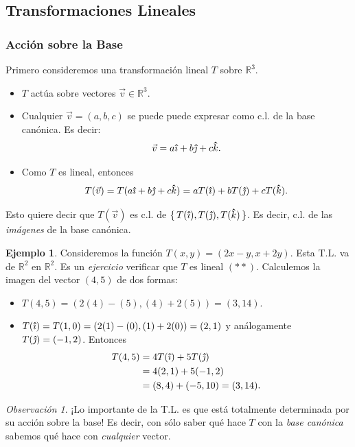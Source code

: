\documentclass[12pt]{article}
\theoremstyle{plain}
\theoremstyle{definition}
\newtheorem{Ex}[Th]{Ejemplo}           %
\theoremstyle{remark}
\newtheorem*{Rmk}{Observación}      %
\newcommand{\thickhat}[1]{\mathbf{\hat{\text{$#1$}}}}
\newcommand{\ii}{\vu{\imath}}
\newcommand{\jj}{\vu{\jmath}}
\newcommand{\kk}{\thickhat{k}}
\newcommand{\bR}{\mathbb{R}}        %
\renewcommand{\:}{\colon}           %
\renewcommand{\.}{\Cdot}                %
\newcommand{\set}[1]{\{\,#1\,\}}    %
\begin{document}
\begin{multicols}{2}
\subsection*{Transformaciones Lineales}

\subsubsection*{Acción sobre la Base}

Primero consideremos una transformación lineal $T$ sobre $\bR^3$. 
\begin{itemize}
    \itemsep=-0.42em
    \item $T$ actúa sobre vectores $\vec v\in\bR^3$.
    \item Cualquier $\vec v=(a,b,c)$ se puede puede expresar como c.l. de la base canónica. Es decir:
    $$\vec{v}=a\ii+b\jj+c\kk.$$
    \item Como $T$ es lineal, entonces 
    $$T(\vec{v})=T(a\ii+b\jj+c\kk)=aT(\ii)+bT(\jj)+cT(\kk).$$
\end{itemize}
Esto quiere decir que $T(\vec{v})$ es c.l. de $\set{T(\ii),T(\jj),T(\kk)}$. Es decir, c.l. de las \emph{imágenes} de la base canónica.

\begin{Ex}
Consideremos la función $T(x,y)=(2x-y,x+2y)$. Esta T.L. va de $\bR^2$ en $\bR^2$. Es un \emph{ejercicio} verificar que $T$ es lineal $(\ast\ast)$. Calculemos la imagen del vector $(4,5)$ de dos formas:
\begin{itemize}
    \itemsep=-0.42em
    \item $T(4,5)=(2(4)-(5),(4)+2(5))=(3,14)$.
    \item $T(\ii)=T(1,0)=(2(1)-(0),(1)+2(0))=(2,1)$ y análogamente $T(\jj)=(-1,2)$. Entonces 
    \begin{align*}
        T(4,5)&=4T(\ii)+5T(\jj)\\
        &=4(2,1)+5(-1,2)\\
        &=(8,4)+(-5,10)=(3,14).
    \end{align*}
\end{itemize}
\end{Ex}

\begin{Rmk}
¡Lo importante de la T.L. es que está totalmente determinada por su acción sobre la base! Es decir, con sólo saber qué hace $T$ con la \emph{base canónica} sabemos qué hace con \emph{cualquier} vector.
\end{Rmk}


\end{multicols}
\end{document}
